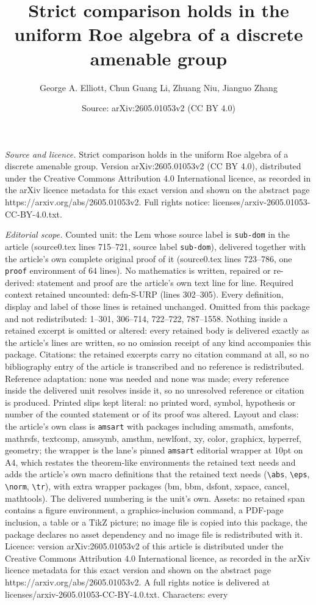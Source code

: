 \documentclass[10pt,a4paper]{amsart}
\title[Strict comparison holds in the uniform Roe algebra of a disc]{Strict comparison holds in the uniform Roe algebra of a discrete amenable group}
\author{George A. Elliott, Chun Guang Li, Zhuang Niu, Jianguo Zhang}
\date{Source: arXiv:2605.01053v2 (CC BY 4.0)}
\begin{document}
\maketitle

\noindent\emph{Source and licence.} Strict comparison holds in the uniform Roe algebra of a discrete amenable group. Version arXiv:2605.01053v2 (CC BY 4.0), distributed under the Creative Commons Attribution 4.0 International licence, as recorded in the arXiv licence metadata for this exact version and shown on the abstract page https://arxiv.org/abs/2605.01053v2. Full rights notice: licenses/arxiv-2605.01053-CC-BY-4.0.txt.\par\smallskip

\noindent\textit{Editorial scope.} Counted unit: the Lem whose source label is \texttt{sub-dom} in the article (source0.tex lines 715--721, source label \texttt{sub-dom}), delivered together with the article's own complete original proof of it (source0.tex lines 723--786, one \texttt{proof} environment of 64 lines). No mathematics is written, repaired or re-derived: statement and proof are the article's own text line for line. Required context retained uncounted: defn-S-URP (lines 302--305). Every definition, display and label of those lines is retained unchanged. Omitted from this package and not redistributed: 1--301, 306--714, 722--722, 787--1558. Nothing inside a retained excerpt is omitted or altered: every retained body is delivered exactly as the article's lines are written, so no omission receipt of any kind accompanies this package. Citations: the retained excerpts carry no citation command at all, so no bibliography entry of the article is transcribed and no reference is redistributed. Reference adaptation: none was needed and none was made; every reference inside the delivered unit resolves inside it, so no unresolved reference or citation is produced. Printed slips kept literal: no printed word, symbol, hypothesis or number of the counted statement or of its proof was altered. Layout and class: the article's own class is \texttt{amsart} with packages including amsmath, amsfonts, mathrsfs, textcomp, amssymb, amsthm, newlfont, xy, color, graphicx, hyperref, geometry; the wrapper is the lane's pinned \texttt{amsart} editorial wrapper at 10pt on A4, which restates the theorem-like environments the retained text needs and adds the article's own macro definitions that the retained text needs (\texttt{\textbackslash abs}, \texttt{\textbackslash eps}, \texttt{\textbackslash norm}, \texttt{\textbackslash tr}), with extra wrapper packages (bm, bbm, dsfont, xspace, cancel, mathtools). The delivered numbering is the unit's own. Assets: no retained span contains a figure environment, a graphics-inclusion command, a PDF-page inclusion, a table or a TikZ picture; no image file is copied into this package, the package declares no asset dependency and no image file is redistributed with it. Licence: version arXiv:2605.01053v2 of this article is distributed under the Creative Commons Attribution 4.0 International licence, as recorded in the arXiv licence metadata for this exact version and shown on the abstract page https://arxiv.org/abs/2605.01053v2. A full rights notice is delivered at licenses/arxiv-2605.01053-CC-BY-4.0.txt. Characters: every 
\end{document}
